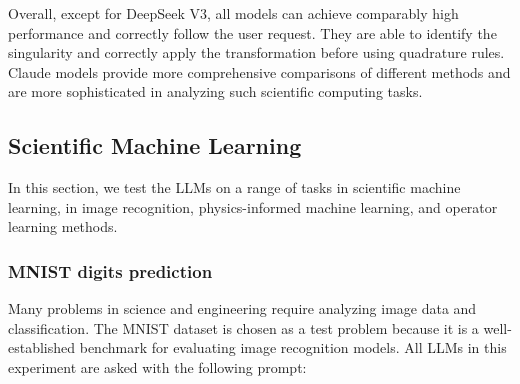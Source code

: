 \documentclass{article}
\begin{document}
\begin{table}[h!]
   \centering
    \renewcommand{\arraystretch}{1.5}
    \caption{Summary of performance of different models in integration.}
    \vspace{2mm}
    \label{tab:integral}
\end{table}

Overall, except for DeepSeek V3, all models can achieve comparably high performance and correctly follow the user request. They are able to identify the singularity and correctly apply the transformation before using quadrature rules. Claude models provide more comprehensive comparisons of different methods and are more sophisticated in analyzing such scientific computing tasks.

\subsection{Scientific Machine Learning}

In this section, we test the LLMs on a range of tasks in scientific machine learning, in image recognition, physics-informed machine learning, and operator learning methods. 

\subsubsection{MNIST digits prediction}

Many problems in science and engineering require analyzing image data and classification. The MNIST \cite{deng2012mnist} dataset is chosen as a test problem because it is a well-established benchmark for evaluating image recognition models. All LLMs in this experiment are asked with the following prompt: 
\end{document}

